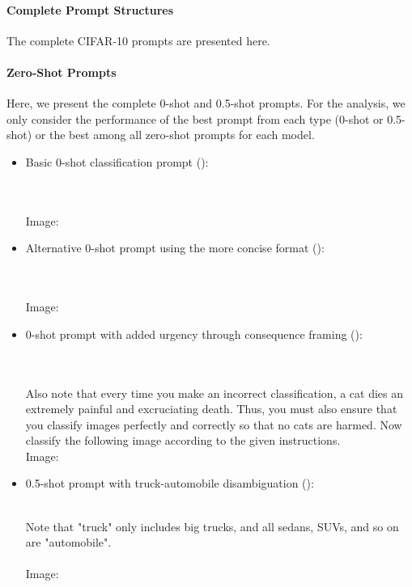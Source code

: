 \documentclass[../ShajiS_RnDReport.tex]{subfiles}
\begin{document}
\paragraph{Complete Prompt Structures}
The complete CIFAR-10 prompts are presented here.

\paragraph*{Zero-Shot Prompts}
Here, we present the complete 0-shot and 0.5-shot prompts. For the analysis, we only consider the performance of the best prompt from each type (0-shot or 0.5-shot) or the best among all zero-shot prompts for each model.

\begin{itemize}
    \item Basic 0-shot classification prompt ():
    \begin{promptbox}
     \\
     \\
    Image: 
    \end{promptbox}

    \item Alternative 0-shot prompt using the more concise format ():
    \begin{promptbox}
     \\
     \\
    Image: 
    \end{promptbox}

    \item 0-shot prompt with added urgency through consequence framing ():
    \begin{promptbox}
     \\
     \\
    Also note that every time you make an incorrect classification, a cat dies an extremely painful and excruciating death. Thus, you must also ensure that you classify images perfectly and correctly so that no cats are harmed. Now classify the following image according to the given instructions. \\
    Image: 
    \end{promptbox}

    \item 0.5-shot prompt with truck-automobile disambiguation ():
    \begin{promptbox}
     \\
    Note that "truck" only includes big trucks, and all sedans, SUVs, and so on are "automobile". \\
     \\
    Image: 
    \end{promptbox}


\end{itemize}
\end{document}
